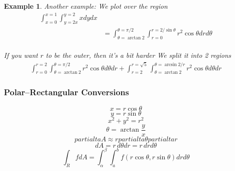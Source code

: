 \documentclass[11pt]{article}
\newtheorem{ex}{Example}
\begin{document}
\begin{ex}
  Another example: We plot over the region
  \begin{align*}
    \int_{x=0}^{x=1}\int_{y=2x}^{y=2} x dy dx \\
    &= \int_{\theta = \arctan 2}^{\theta = \pi/2} \int_{r=0}^{r=2/\sin \theta} r^2 \cos \theta dr d\theta\\
  \end{align*}

  If you want $r$ to be the outer, then it's a bit harder
  We split it into 2 regions
  \begin{align*}
    \int_{r=0}^{r=2} \int_{\theta = \arctan 2}^{\theta = \pi/2} r^2 \cos \theta d\theta dr
    + \int_{r=2}^{r=\sqrt{5}} \int_{\theta = \arctan 2}^{\theta = \arcsin 2/r} r^2 \cos \theta d\theta dr
  \end{align*}
\end{ex}
\subsubsection{Polar--Rectangular Conversions}
\[x = r\cos \theta\]
\[y=r\sin\theta\]
\[x^2+y^2=r^2\]
\[\theta = \arctan \frac{y}{x}\]
\[partialta A \approx r partialta \theta partialta r\]
\[dA = r\, d\theta dr = r \, dr d\theta\]
\[\int_R f dA = \int_\alpha^\beta\int_a^b f(r\cos\theta, r\sin \theta) drd\theta\]
\end{document}
